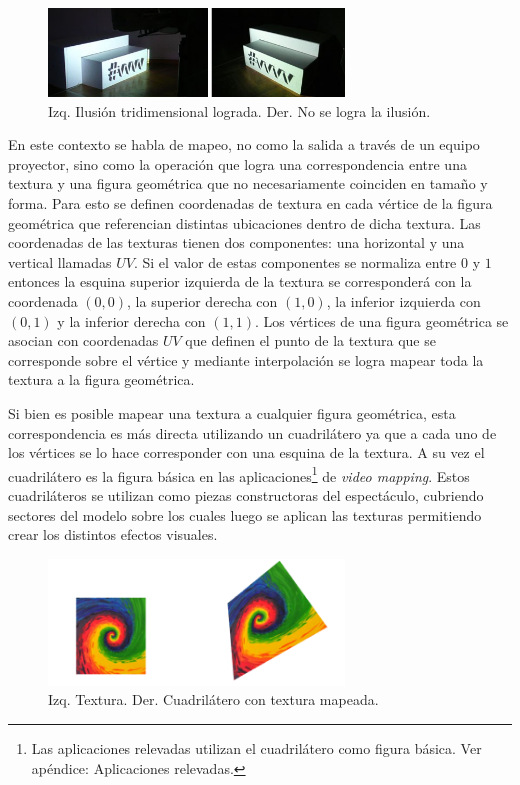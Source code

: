 \begin{figure}[H]
  \centering
    \includegraphics[width=0.7\textwidth]{./Cap2_videomapping/3dillusion}
  \caption[vvvv.org]{Izq. Ilusión tridimensional lograda. Der. No se logra la ilusión.}
  \label{fig:3dillusion}
\end{figure}

En este contexto se habla de mapeo, no como la salida a través de un equipo proyector, sino como la operación que logra una correspondencia entre una textura y una figura geométrica que no necesariamente coinciden en tamaño y forma. Para esto se definen coordenadas de textura en cada vértice de la figura geométrica que referencian distintas ubicaciones dentro de dicha textura.
Las coordenadas de las texturas tienen dos componentes: una horizontal y una vertical llamadas $UV$. Si el valor de estas componentes se normaliza entre $0$ y $1$ entonces la esquina superior izquierda de la textura se corresponderá con la coordenada $(0,0)$, la superior derecha con $(1,0)$, la inferior izquierda con $(0,1)$ y la inferior derecha con $(1,1)$.
Los vértices de una figura geométrica se asocian con coordenadas $UV$ que definen el punto de la textura que se corresponde sobre el vértice y mediante interpolación se logra mapear toda la textura a la figura geométrica.

Si bien es posible mapear una textura a cualquier figura geométrica, esta correspondencia es más directa utilizando un cuadrilátero ya que a cada uno de los vértices se lo hace corresponder con una esquina de la textura. A su vez el cuadrilátero es la figura básica en las aplicaciones\footnote{Las aplicaciones relevadas utilizan el cuadrilátero como figura básica. Ver apéndice: Aplicaciones relevadas.} de \emph{video mapping}.
Estos cuadriláteros se utilizan como piezas constructoras del espectáculo, cubriendo sectores del modelo sobre los cuales luego se aplican las texturas permitiendo crear los distintos efectos visuales.

\begin{figure}[H]
  \centering
    \includegraphics[width=0.7\textwidth]{./Cap2_videomapping/2dmapping}
  \caption[Imagen propia.]{Izq. Textura. Der. Cuadrilátero con textura mapeada.}
  \label{fig:2dmapping}
\end{figure}

